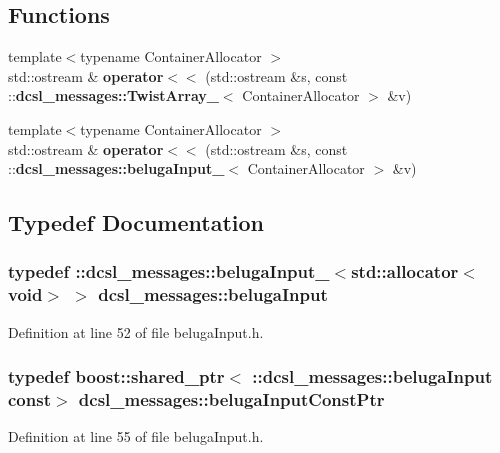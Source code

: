 \subsection*{\-Functions}
\begin{DoxyCompactItemize}
\item 
{\footnotesize template$<$typename Container\-Allocator $>$ }\\std\-::ostream \& {\bf operator$<$$<$} (std\-::ostream \&s, const \-::{\bf dcsl\-\_\-messages\-::\-Twist\-Array\-\_\-}$<$ \-Container\-Allocator $>$ \&v)
\item 
{\footnotesize template$<$typename Container\-Allocator $>$ }\\std\-::ostream \& {\bf operator$<$$<$} (std\-::ostream \&s, const \-::{\bf dcsl\-\_\-messages\-::beluga\-Input\-\_\-}$<$ \-Container\-Allocator $>$ \&v)
\end{DoxyCompactItemize}


\subsection{\-Typedef \-Documentation}
\subsubsection[{beluga\-Input}]{\setlength{\rightskip}{0pt plus 5cm}typedef \-::{\bf dcsl\-\_\-messages\-::beluga\-Input\-\_\-}$<$std\-::allocator$<$void$>$ $>$ {\bf dcsl\-\_\-messages\-::beluga\-Input}}\label{namespacedcsl__messages_aaa07218fd9bb3b31cb9d855e68a1bf03}


\-Definition at line 52 of file beluga\-Input.\-h.

\subsubsection[{beluga\-Input\-Const\-Ptr}]{\setlength{\rightskip}{0pt plus 5cm}typedef boost\-::shared\-\_\-ptr$<$ \-::{\bf dcsl\-\_\-messages\-::beluga\-Input} const$>$ {\bf dcsl\-\_\-messages\-::beluga\-Input\-Const\-Ptr}}\label{namespacedcsl__messages_ad097cf5a7e8480b9ea2bb393b27a7ded}


\-Definition at line 55 of file beluga\-Input.\-h.

